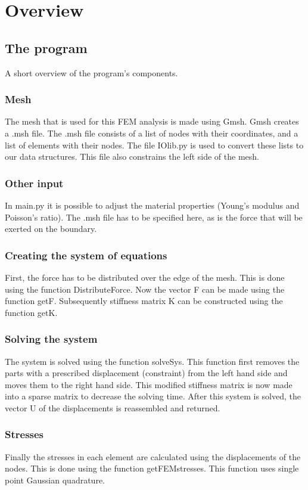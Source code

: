 \chapter{Overview}

\section{The program}
A short overview of the program's components.

\subsection{Mesh}
The mesh that is used for this FEM analysis is made using Gmsh. Gmsh creates a .msh file. The .msh file consists of a list of nodes with their coordinates, and a list of elements with their nodes. The file IOlib.py is used to convert these lists to our data structures. This file also constrains the left side of the mesh. 
\subsection{Other input}
In main.py it is possible to adjust the material properties (Young's modulus and Poisson's ratio). The .msh file has to be specified here, as is the force that will be exerted on the boundary. 
\subsection{Creating the system of equations}
First, the force has to be distributed over the edge of the mesh. This is done using the function Distribute\textunderscore Force. Now the vector F can be made using the function getF. Subsequently stiffness matrix K can be constructed using the function getK. 
\subsection{Solving the system}
The system is solved using the function solveSys. This function first removes the parts with a prescribed displacement (constraint) from the left hand side and moves them to the right hand side. This modified stiffness matrix is now made into a sparse matrix to decrease the solving time. After this system is solved, the vector U of the displacements is reassembled and returned. 
\subsection{Stresses}
Finally the stresses in each element are calculated using the displacements of the nodes. This is done using the function get\textunderscore FEM\textunderscore stresses. This function uses single point Gaussian quadrature.


